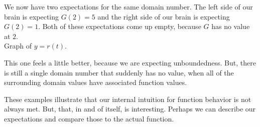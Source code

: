 \documentclass{ximera}
\begin{document}
We now have two expectations for the same domain number. The left side of our brain is expecting $G(2)=5$ and the right side of our brain is expecting $G(2)=1$. Both of these expectations come up empty, because $G$ has no value at $2$. \\







Graph of $y = r(t)$.  

\begin{image}
\end{image}



This one feels a little better, because we are expecting unboundedness.  But, there is still a single domain number that suddenly has no value, when all of the surrounding domain values have associated function values.












These examples illustrate that our internal intuition for function behavior is not always met.  But, that, in and of itself, is interesting.  Perhaps we can describe our expectations and compare those to the actual function.
\end{document}
